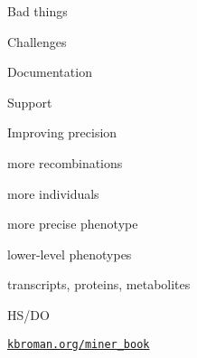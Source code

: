 \documentclass[12pt,t,aspectratio=169]{beamer}
\begin{document}
\begin{frame}{}

\vspace*{16.7mm}

\centerline{\Large Bad things}

\end{frame}




\begin{frame}{Challenges}

  \bbi
\item Documentation
\item Support
  \ei

\end{frame}



\begin{frame}[c]{Improving precision}

  \vspace{-20mm}

  \bbi
\item more recombinations
\item more individuals
\item more precise phenotype
\item lower-level phenotypes
\bi
\item transcripts, proteins, metabolites
  \ei
  \ei

\end{frame}



\begin{frame}[c]{HS/DO}

  \vspace{2mm}


\end{frame}





\begin{frame}[c]{}

  \vspace*{5mm}



\vspace{3mm}

\hfill \href{https://kbroman.org/miner_book}{\scriptsize \lolit \tt kbroman.org/miner\_book}

\end{frame}
\end{document}

